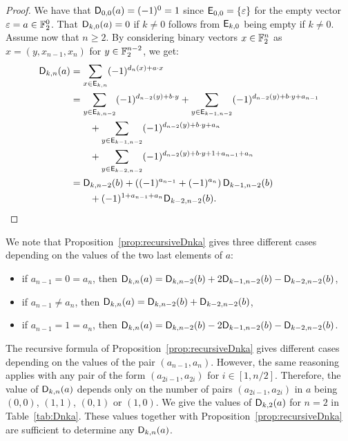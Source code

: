 \documentclass{llncs}
\begin{document}
\begin{proof}
    We have that $\Dnka 00a=(-1)^0=1$ since $\Ekn 00=\{\varepsilon\}$ for the empty vector $\varepsilon=a\in\F_2^0$. That $\Dnka 0ka=0$ if $k\neq 0$ follows from $\Ekn k0$ being empty if $k\neq 0$. Assume now that $n\geq 2$. By considering binary vectors $x\in\F_2^n$ as $x=(y,x_{n-1},x_n)$ for $y\in\F_2^{n-2}$, we get:
    \begin{align*}
		\Dnka{n}{k}{a}&=\sum_{x\in \Ekn{k}{n}} (-1)^{d_n(x) +a\cdot x}\\
		&=\sum_{y\in \Ekn{k}{n-2}} (-1)^{d_{n-2}(y) +b\cdot y}+
		\sum_{y\in \Ekn{k-1}{n-2}} (-1)^{d_{n-2}(y) +b\cdot y + a_{n-1}}\\
		&\qquad+\sum_{y\in \Ekn{k-1}{n-2}} (-1)^{d_{n-2}(y) +b\cdot y + a_{n}}\\
		&\qquad+\sum_{y\in \Ekn{k-2}{n-2}} (-1)^{d_{n-2}(y) +b\cdot y +1 + a_{n-1}+ a_{n}}\\
		&=\Dnka{n-2}{k}{b}+\left((-1)^{a_{n-1}}+ (-1)^{a_{n}}\right)\Dnka{n-2}{k-1}{b}\\
		&\qquad+ (-1)^{1+a_{n-1}+a_n} \Dnka{n-2}{k-2}{b}.\qedhere
    \end{align*}
\end{proof}

\begin{remark}
    We note that Proposition~\ref{prop:recursiveDnka} gives three different cases depending on the values of the two last elements of $a$:%
	\begin{itemize}
		\item if $a_{n-1}=0=a_n$, then $\Dnka{n}{k}{a}=\Dnka{n-2}{k}{b}+2\Dnka{n-2}{k-1}{b}-\Dnka{n-2}{k-2}{b}$,
		\item if $a_{n-1} \ne a_n$, then $\Dnka{n}{k}{a}=\Dnka{n-2}{k}{b}+\Dnka{n-2}{k-2}{b}$,
		\item if $a_{n-1}=1=a_n$, then $\Dnka{n}{k}{a}=\Dnka{n-2}{k}{b}-2\Dnka{n-2}{k-1}{b}-\Dnka{n-2}{k-2}{b}$.
	\end{itemize}
\end{remark}

\begin{remark}\label{rmk:dependence_dnka}
    The recursive formula of Proposition~\ref{prop:recursiveDnka} gives different cases depending on the values of the pair $(a_{n-1},a_n)$. However, the same reasoning applies with any pair of the form $(a_{2i-1}, a_{2i})$ for $i\in[1,n/2]$. Therefore, the value of $\Dnka{n}{k}{a}$ depends only on the number of pairs $(a_{2i-1}, a_{2i})$ in $a$ being $(0,0)$, $(1,1)$, $(0,1)$ or $(1,0)$. We give the values of $\Dnka{2}{k}{a}$ for $n=2$ in Table~\ref{tab:Dnka}. These values together with Proposition~\ref{prop:recursiveDnka} are sufficient to determine any $\Dnka{n}{k}{a}$.
\end{remark}
\end{document}

